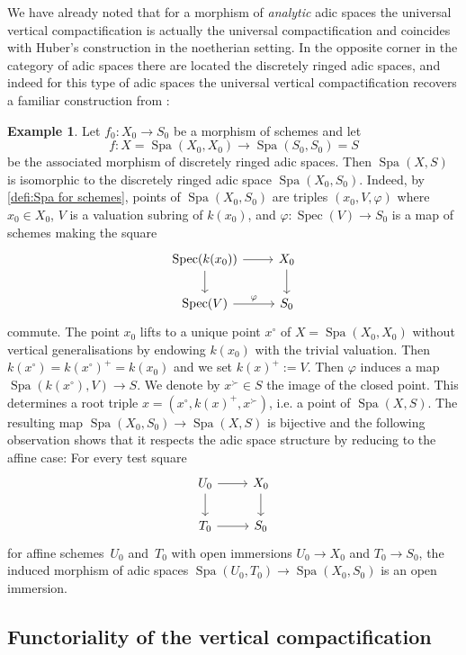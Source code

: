 \documentclass[a4paper,twoside,11pt,reqno]{amsart}
\newcommand{\la}{\longrightarrow}
\DeclareMathOperator{\Spec}{Spec}
\DeclareMathOperator{\Spa}{Spa}
\theoremstyle{definition}
\newtheorem{ex}[thm]{Example}
\numberwithin{equation}{subsection}
\begin{document}
We have already noted that for a morphism of \emph{analytic} adic spaces the universal vertical compactification is actually the universal compactification and coincides with Huber's construction in the noetherian setting.
In the opposite corner in the category of adic spaces there are located the discretely ringed adic spaces, and indeed for this type of adic spaces the universal vertical compactification recovers a familiar construction from \cite[\S~3.1]{Temkin2011:RelativeRiemannZariskiSpacesa}:


\begin{ex} \label{example-Spa-schemes}
        Let $f_0\colon X_0\to S_0$ be a morphism of schemes and let 
    \[
        f\colon X=\Spa(X_0, X_0)\la \Spa(S_0, S_0)=S
    \]
    be the associated morphism of discretely ringed adic spaces. Then $\Spa(X, S)$ is isomorphic to the discretely ringed adic space $\Spa(X_0, S_0)$.
    Indeed, by \cref{defi:Spa for schemes}, points of $\Spa(X_0, S_0)$ are triples $(x_0, V, \varphi)$ where $x_0\in X_0$, $V$ is a valuation subring of $k(x_0)$, and $\varphi \colon \Spec(V)\to S_0$ is a map of schemes making the square
\[ 
    \begin{tikzcd}
        \Spec(k(x_0)) \ar[r] \ar[d] & X_0 \ar[d] \\
        \Spec(V)\ar[r,"\varphi"] & S_0
    \end{tikzcd}
\]
commute.
The point $x_0$ lifts to a unique point $x^\circ$ of $X=\Spa(X_0, X_0)$ without vertical generalisations by endowing $k(x_0)$ with the trivial valuation.
Then $k(x^\circ) = k(x^\circ)^+ = k(x_0)$ and we set $k(x)^+ := V$.
Then $\varphi$ induces a map $\Spa(k(x^\circ), V)\to S$.
We denote by $x^\succ \in S$ the image of the closed point.
This determines a root triple $x = (x^\circ,k(x)^+,x^\succ)$, i.e. a point of $\Spa(X,S)$.
The resulting map $\Spa(X_0,S_0) \to \Spa(X,S)$ is bijective and the following observation shows that it respects the adic space structure by reducing to the affine case:
For every test square
\[
    \begin{tikzcd}
        U_0 \ar[r]  \ar[d]  & X_0   \ar[d] \\
        T_0 \ar[r]          & S_0
    \end{tikzcd}
\]
for affine schemes~$U_0$ and~$T_0$ with open immersions $U_0 \to X_0$ and $T_0 \to S_0$, the induced morphism of adic spaces $\Spa(U_0,T_0) \to \Spa(X_0,S_0)$ is an open immersion.
\end{ex}


\subsection{Functoriality of the vertical compactification}
\end{document}
